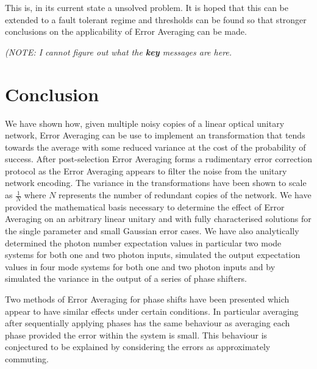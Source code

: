 \documentclass[aps,pra,twocolumn,superscriptaddress,numerical,floatfix]{revtex4-1}
\begin{document}
This is, in its current state a unsolved problem. It is hoped that this can be extended to a fault tolerant regime and thresholds can be found so that stronger conclusions on the applicability of Error Averaging can be made.

\emph{(NOTE: I cannot figure out what the \textbf{key} messages are here.}

\section{Conclusion\label{Conclusion}}

We have shown how, given multiple noisy copies of a linear optical unitary network, Error Averaging can be use to implement an transformation that tends towards the average with some reduced variance at the cost of the probability of success.  After post-selection Error Averaging forms a rudimentary error correction protocol as the Error Averaging appears to filter the noise from the unitary network encoding. The variance in the transformations have been shown to scale as $\frac{1}{N}$ where $N$ represents the number of redundant copies of the network. We have provided the mathematical basis necessary to determine the effect of Error Averaging on an arbitrary linear unitary and with fully characterised solutions for the single parameter and small Gaussian error cases. We have also analytically determined the photon number expectation values in particular two mode systems for both one and two photon inputs, simulated the output expectation values in four mode systems for both one and two photon inputs and by simulated the variance in the output of a series of phase shifters.

Two methods of Error Averaging for phase shifts have been presented which appear to have similar effects under certain conditions. In particular averaging after sequentially applying phases has the same behaviour as averaging each phase provided the error within the system is small. This behaviour is conjectured to be explained by considering the errors as approximately commuting.


\end{document}
